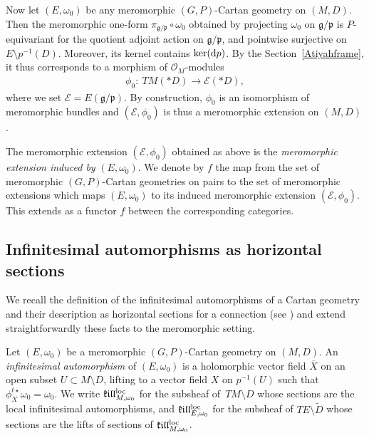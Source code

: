 \documentclass[10pt,a4paper]{amsart}
\numberwithin{equation}{section}
\begin{document}
Now let $(E,\omega_0)$ be any meromorphic $(G,P)$-Cartan geometry on $(M,D)$. Then the meromorphic one-form $\pi_{\mathfrak{g}/\mathfrak{p}}\circ \omega_0$ obtained by projecting $\omega_0$ on $\mathfrak{g}/\mathfrak{p}$ is $P$-equivariant for the quotient adjoint action on $\mathfrak{g}/\mathfrak{p}$, and pointwise surjective on $E\setminus p^{-1}(D)$. Moreover, its kernel contains $\ker({\rm d}p)$. By the Section~\ref{Atiyahframe}, it thus corresponds to a morphism of $\mathcal{O}_M$-modules
\begin{gather*}%
 \phi_0 \colon\ TM(* D) \longrightarrow \mathcal{E}(* D),
 \end{gather*}
 where we set $\mathcal{E}=E(\mathfrak{g}/\mathfrak{p})$. By construction, $\phi_0$ is an isomorphism of meromorphic bundles and $(\mathcal{E},\phi_0)$ is thus a meromorphic extension on $(M,D)$.

\begin{Definition}\label{fonct} The meromorphic extension $(\mathcal{E},\phi_0)$ obtained as above is the \textit{meromorphic extension induced by} $(E,\omega_0)$. We denote by $f$ the map from the set of meromorphic $(G,P)$-Cartan geometries on pairs to the set of meromorphic extensions which maps $(E,\omega_0)$ to its induced meromorphic extension $(\mathcal{E},\phi_0)$. This extends as a functor $f$ between the corresponding categories. \end{Definition} %

\subsection{Infinitesimal automorphisms as horizontal sections}
We recall the definition of the infinitesimal automorphisms of a Cartan geometry and their description as horizontal sections for a connection (see \cite[Lemma 1.5.12]{Cap}) and extend straightforwardly these facts to the meromorphic setting.

\begin{Definition}\label{kill} Let $(E,\omega_0)$ be a meromorphic $(G,P)$-Cartan geometry on $(M,D)$. An \textit{infinitesimal automorphism} of $(E,\omega_0)$ is a holomorphic vector field $\overline{X}$ on an open subset $U\subset M\setminus D$, lifting to a vector field $X$ on $p^{-1}(U)$ such that $\phi_X^{t \star} \omega_0 = \omega_0$. We write $\mathfrak{k}\mathfrak{i}\mathfrak{l}\mathfrak{l}^{\rm loc}_{M,\omega_0}$ for the subsheaf of~$TM\setminus D$ whose sections are the local infinitesimal automorphisms, and $\mathfrak{k}\mathfrak{i}\mathfrak{l}\mathfrak{l}^{\rm loc}_{E,\omega_0}$ for the subsheaf of $TE\setminus \tilde{D}$ whose sections are the lifts of sections of $\mathfrak{k}\mathfrak{i}\mathfrak{l}\mathfrak{l}^{\rm loc}_{M,\omega_0}$. \end{Definition}
\end{document}
